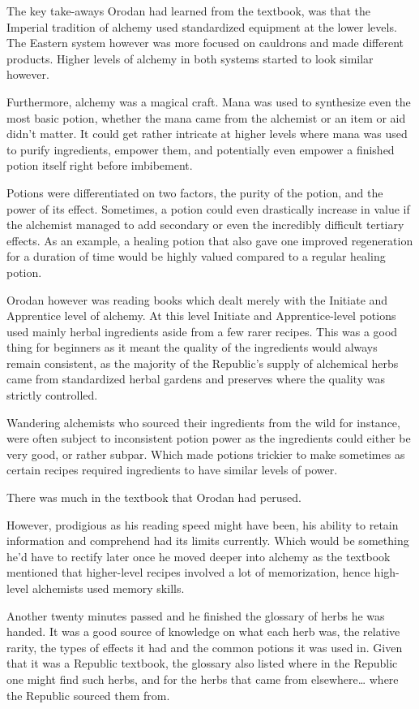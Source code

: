 \documentclass[a4paper,10pt]{book}
\begin{document}
The key take-aways Orodan had learned from the textbook, was that the Imperial tradition of alchemy used standardized equipment at the lower levels. The Eastern system however was more focused on cauldrons and made different products. Higher levels of alchemy in both systems started to look similar however.\par
Furthermore, alchemy was a magical craft. Mana was used to synthesize even the most basic potion, whether the mana came from the alchemist or an item or aid didn’t matter. It could get rather intricate at higher levels where mana was used to purify ingredients, empower them, and potentially even empower a finished potion itself right before imbibement.\par
Potions were differentiated on two factors, the purity of the potion, and the power of its effect. Sometimes, a potion could even drastically increase in value if the alchemist managed to add secondary or even the incredibly difficult tertiary effects. As an example, a healing potion that also gave one improved regeneration for a duration of time would be highly valued compared to a regular healing potion.\par
Orodan however was reading books which dealt merely with the Initiate and Apprentice level of alchemy. At this level Initiate and Apprentice-level potions used mainly herbal ingredients aside from a few rarer recipes. This was a good thing for beginners as it meant the quality of the ingredients would always remain consistent, as the majority of the Republic’s supply of alchemical herbs came from standardized herbal gardens and preserves where the quality was strictly controlled.\par
Wandering alchemists who sourced their ingredients from the wild for instance, were often subject to inconsistent potion power as the ingredients could either be very good, or rather subpar. Which made potions trickier to make sometimes as certain recipes required ingredients to have similar levels of power.\par
There was much in the textbook that Orodan had perused.\par
However, prodigious as his reading speed might have been, his ability to retain information and comprehend had its limits currently. Which would be something he’d have to rectify later once he moved deeper into alchemy as the textbook mentioned that higher-level recipes involved a lot of memorization, hence high-level alchemists used memory skills.\par
Another twenty minutes passed and he finished the glossary of herbs he was handed. It was a good source of knowledge on what each herb was, the relative rarity, the types of effects it had and the common potions it was used in. Given that it was a Republic textbook, the glossary also listed where in the Republic one might find such herbs, and for the herbs that came from elsewhere… where the Republic sourced them from.\par
\end{document}
